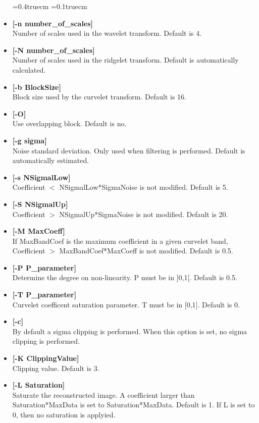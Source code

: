 \begin{itemize}
\baselineskip=0.4truecm
\itemsep=0.1truecm
\item {\bf [-n number\_of\_scales]} \\
Number of scales used in the wavelet transform.
Default is 4. 
\item {\bf [-N number\_of\_scales]} \\
Number of scales used in the ridgelet transform.
Default is automatically calculated.
\item {\bf [-b BlockSize]} \\
Block size used by the curvelet transform. Default is 16.
\item {\bf [-O]} \\
Use overlapping block. Default is no.
\item {\bf [-g sigma]} \\
Noise standard deviation. Only used when filtering is performed.
Default is automatically estimated.
\item {\bf [-s NSigmalLow]} \\
 Coefficient $<$ NSigmalLow*SigmaNoise is not modified.
 Default is   5.
\item {\bf [-S NSigmalUp]} \\
 Coefficient $>$ NSigmalUp*SigmaNoise is not modified.
 Default is  20.
\item {\bf [-M MaxCoeff]} \\
If MaxBandCoef is the maximum coefficient in a given curvelet band,
 Coefficient $>$ MaxBandCoef*MaxCoeff is not modified.
 Default is 0.5.
\item {\bf  [-P P\_parameter]} \\
Determine the degree on non-linearity. P must be in ]0,1[.  
Default is 0.5.
\item {\bf [-T P\_parameter]} \\
 Curvelet coefficent saturation parameter. T must be in [0,1].  
Default is 0.
\item {\bf [-c]} \\
By default a sigma clipping is performed. When this option is set, no
sigma clipping is performed.
\item {\bf [-K ClippingValue]} \\
Clipping value. Default is 3.
\item {\bf [-L Saturation]} \\
Saturate the reconstructed image.
A coefficient larger than Saturation*MaxData is set to Saturation*MaxData.
Default is  1. If L is set to 0, then no saturation is applyied.
\end{itemize}

